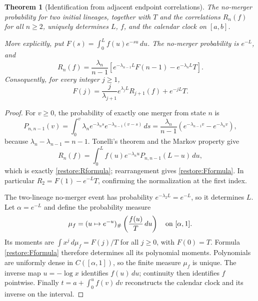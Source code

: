 \documentclass[11pt]{article}
\newtheorem{theorem}{Theorem}[section]
\theoremstyle{definition}
\theoremstyle{remark}
\numberwithin{equation}{section}
\begin{document}
\begin{theorem}[Identification from adjacent endpoint correlations]
\label{restore:identify}
The no-merger probability for two initial lineages, together with $T$ and
the correlations $R_n(f)$ for all $n\ge2$, uniquely determines $L$, $f$,
and the calendar clock on $[a,b]$.

More explicitly, put $F(s)=\int_0^L f(u)e^{-su}\,du$.  The no-merger
probability is $e^{-L}$, and
\begin{equation}\label{restore:Rformula}
 R_n(f)=\frac{\lambda_n}{n-1}
       \left[e^{-\lambda_{n-1}L}F(n-1)-e^{-\lambda_nL}T\right].
\end{equation}
Consequently, for every integer $j\ge1$,
\begin{equation}\label{restore:Fformula}
 F(j)=\frac{j}{\lambda_{j+1}}e^{\lambda_jL}R_{j+1}(f)
                         +e^{-jL}T.
\end{equation}
\end{theorem}
\begin{proof}
For $v\ge0$, the probability of exactly one merger from state $n$ is
\[
 P_{n,n-1}(v)
 =\int_0^v\lambda_ne^{-\lambda_n s}
                           e^{-\lambda_{n-1}(v-s)}\,ds
 =\frac{\lambda_n}{n-1}
       \left(e^{-\lambda_{n-1}v}-e^{-\lambda_nv}\right),
\]
because $\lambda_n-\lambda_{n-1}=n-1$.  Tonelli's theorem and the Markov
property give
\[
 R_n(f)=\int_0^L f(u)e^{-\lambda_nu}P_{n,n-1}(L-u)\,du,
\]
which is exactly \eqref{restore:Rformula}; rearrangement gives
\eqref{restore:Fformula}.  In particular $R_2=F(1)-e^{-L}T$, confirming
the normalization at the first index.

The two-lineage no-merger event has probability $e^{-\lambda_2L}=e^{-L}$,
so it determines $L$.  Let $\alpha=e^{-L}$ and define the probability
measure
\begin{equation}\label{restore:clockmeasure}
 \mu_f=(u\mapsto e^{-u})_\#\left(\frac{f(u)}{T}\,du\right)
               \quad\hbox{on }[\alpha,1].
\end{equation}
Its moments are $\int x^j\,d\mu_f=F(j)/T$ for all $j\ge0$, with
$F(0)=T$.  Formula \eqref{restore:Fformula} therefore determines all
its polynomial moments.  Polynomials are uniformly dense in
$C([\alpha,1])$, so the finite measure $\mu_f$ is unique.  The inverse
map $u=-\log x$ identifies $f(u)\,du$; continuity then identifies $f$
pointwise.  Finally $t=a+\int_0^u f(v)\,dv$ reconstructs the calendar
clock and its inverse on the interval.
\end{proof}
\end{document}
